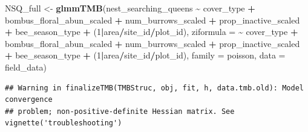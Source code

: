 \documentclass[
]{article}
\newenvironment{Shaded}{\begin{snugshade}}{\end{snugshade}}
\newcommand{\AttributeTok}[1]{\textcolor[rgb]{0.13,0.29,0.53}{#1}}
\newcommand{\DecValTok}[1]{\textcolor[rgb]{0.00,0.00,0.81}{#1}}
\newcommand{\FunctionTok}[1]{\textcolor[rgb]{0.13,0.29,0.53}{\textbf{#1}}}
\newcommand{\NormalTok}[1]{#1}
\newcommand{\OtherTok}[1]{\textcolor[rgb]{0.56,0.35,0.01}{#1}}
\newcommand{\SpecialCharTok}[1]{\textcolor[rgb]{0.81,0.36,0.00}{\textbf{#1}}}
\begin{document}
\begin{Shaded}
\begin{Highlighting}[]
\NormalTok{NSQ\_full }\OtherTok{\textless{}{-}} \FunctionTok{glmmTMB}\NormalTok{(nest\_searching\_queens }\SpecialCharTok{\textasciitilde{}}\NormalTok{ cover\_type }\SpecialCharTok{+} 
\NormalTok{                      bombus\_floral\_abun\_scaled }\SpecialCharTok{+} 
\NormalTok{                      num\_burrows\_scaled }\SpecialCharTok{+} 
\NormalTok{                      prop\_inactive\_scaled }\SpecialCharTok{+}
\NormalTok{                      bee\_season\_type }\SpecialCharTok{+} 
\NormalTok{                      (}\DecValTok{1}\SpecialCharTok{|}\NormalTok{area}\SpecialCharTok{/}\NormalTok{site\_id}\SpecialCharTok{/}\NormalTok{plot\_id),}
                    \AttributeTok{ziformula =} \SpecialCharTok{\textasciitilde{}}\NormalTok{ cover\_type }\SpecialCharTok{+} 
\NormalTok{                      bombus\_floral\_abun\_scaled }\SpecialCharTok{+} 
\NormalTok{                      num\_burrows\_scaled }\SpecialCharTok{+}
\NormalTok{                      prop\_inactive\_scaled }\SpecialCharTok{+}
\NormalTok{                      bee\_season\_type }\SpecialCharTok{+}
\NormalTok{                      (}\DecValTok{1}\SpecialCharTok{|}\NormalTok{area}\SpecialCharTok{/}\NormalTok{site\_id}\SpecialCharTok{/}\NormalTok{plot\_id),}
                    \AttributeTok{family =}\NormalTok{ poisson, }
                    \AttributeTok{data =}\NormalTok{ field\_data)}
\end{Highlighting}
\end{Shaded}

\begin{verbatim}
## Warning in finalizeTMB(TMBStruc, obj, fit, h, data.tmb.old): Model convergence
## problem; non-positive-definite Hessian matrix. See vignette('troubleshooting')
\end{verbatim}
\end{document}
